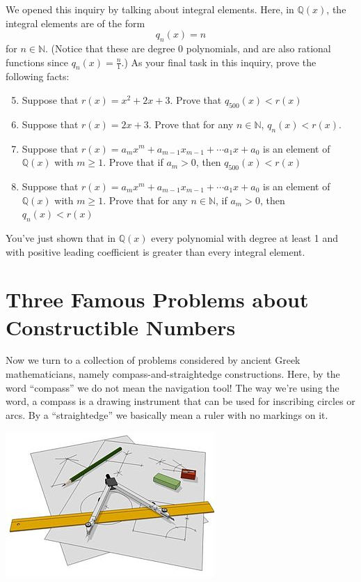 \documentclass[11pt]{article}
\newenvironment{task}
	{\begin{mdframed}[linecolor=lightgray, linewidth=3pt]\raggedright}
	{\end{mdframed}}
\theoremstyle{definition}
\begin{document}
\begin{task}
We opened this inquiry by talking about integral elements. Here, in $\mathbb{Q}(x)$, the integral elements are of the form
\[ q_n(x) = n \]
for $n\in\mathbb{N}$. (Notice that these are degree 0 polynomials, and are also rational functions since $q_n(x) = \frac{n}{1}$.) As your final task in
this inquiry, prove the following facts:

\begin{enumerate}
    \setcounter{enumi}{4}
  \item Suppose that $r(x) =  x^2 + 2x + 3$. Prove that $q_{500}(x) < r(x)$
        \vspace{1.5in}
  \item Suppose that $r(x) =  2x + 3$. Prove that for any $n\in\mathbb{N}$, $q_n(x) < r(x)$.
        \vspace{1.5in}
  \item Suppose that $r(x) =  a_mx^m + a_{m-1}x_{m-1}+\cdots a_1x + a_0$ is an element
    of $\mathbb{Q}(x)$ with $m \geq 1$. Prove that if $a_m > 0$, then $q_{500}(x) < r(x)$
        \vspace{1.5in}
  \item Suppose that $r(x) =  a_mx^m + a_{m-1}x_{m-1}+\cdots a_1x + a_0$ is an element
    of $\mathbb{Q}(x)$ with $m \geq 1$. Prove that for any $n\in\mathbb{N}$, if $a_m > 0$, then $q_{n}(x) < r(x)$
        \vspace{1.5in}
\end{enumerate}

You've just shown that in $\mathbb{Q}(x)$ every polynomial with degree at least 1 and with positive leading coefficient is greater than every integral
element. 
\end{task}\newpage


\part{Three Famous Problems about Constructible Numbers}

Now we turn to a collection of problems considered by ancient Greek mathematicians, namely compass-and-straightedge constructions. 
Here, by the word ``compass'' we do not mean the navigation tool! The way we're using the word, a compass is a drawing instrument 
that can be used for inscribing circles or arcs. By a ``straightedge'' we basically mean a ruler with no markings on it. 

\begin{center}
\includegraphics{straight_edge_compass_wikipedia.jpg}
\end{center}
\end{document}
